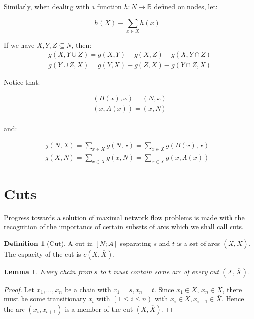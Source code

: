 \documentclass[titlepage]{article}
\newcommand{\R}{\mathbb{R}}
\newcommand{\Xbar}{\ensuremath{\overline{X}}}
\theoremstyle{plain}
\newtheorem{lemma}{Lemma}[theorem]
\theoremstyle{definition}
\newtheorem{definition}{Definition}[theorem]
\theoremstyle{remark}
\begin{document}
Similarly, when dealing with a function $h: N \rightarrow \R$ defined on
nodes, let:

\begin{equation}
    \tag{function on node-set}
    h(X) \equiv \sum_{x \in X} h(x)
\end{equation}

If we have $X, Y, Z \subseteq N$, then:
\begin{align*}
    &g(X, Y \cup Z) = g(X, Y) + g(X, Z) - g(X, Y \cap Z)  \\
    &g(Y \cup Z, X) = g(Y, X) + g(Z, X) - g(Y \cap Z, X)
\end{align*}

Notice that:

\begin{align*}
    &(B(x), x) = (N, x) \\
    &(x, A(x)) = (x, N) \\
\end{align*}

and:


\begin{align*}
      g(N, X) = \sum_{x \in X} g(N, x) = \sum_{x \in X} g(B(x), x) \\
      g(X, N) = \sum_{x \in X} g(x, N) = \sum_{x \in X} g(x, A(x))
\end{align*}
 

\section{Cuts}
Progress towards a solution of maximal network flow problems is made with the
recognition of the importance of certain subsets of arcs which we shall
call cuts.

\begin{definition}[Cut]
    A cut in $[N; A]$ separating $s$ and $t$ is a set of arcs $(X, \Xbar)$.
    The capacity of the cut is $c(X, \Xbar)$.
\end{definition}

\begin{lemma}
    Every chain from $s$ to $t$ must contain some arc of every cut $(X, \Xbar)$.
\end{lemma}
\begin{proof}
    Let $x_1, \dots, x_n$ be a chain with $x_1 = s, x_n = t$. Since $x_1 \in X$,
    $x_n \in \Xbar$, there must be some transitionary $x_i$ with $(1 \leq i \leq n)$ with
    $x_i \in X, x_{i+1} \in \Xbar$.  Hence the arc $(x_i, x_{i+1})$ is a 
    member of the cut $(X, \Xbar)$.
\end{proof}
\end{document}

